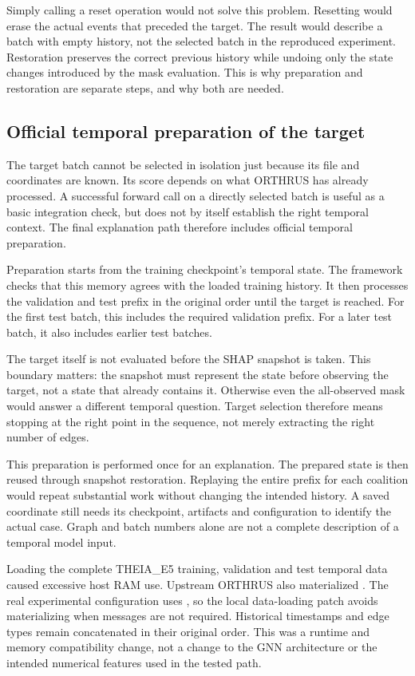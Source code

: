 \documentclass[11pt,a4paper]{article}
\newcommand{\code}[1]{\texttt{\detokenize{#1}}}
\begin{document}
Simply calling a reset operation would not solve this problem. Resetting would
erase the actual events that preceded the target. The result would describe a
batch with empty history, not the selected batch in the reproduced experiment.
Restoration preserves the correct previous history while undoing only the
state changes introduced by the mask evaluation. This is why preparation and
restoration are separate steps, and why both are needed.

\subsection{Official temporal preparation of the target}
The target batch cannot be selected in isolation just because its file and
coordinates are known. Its score depends on what ORTHRUS has already processed.
A successful forward call on a directly selected batch is useful as a basic
integration check, but does not by itself establish the right temporal context.
The final explanation path therefore includes official temporal preparation.

Preparation starts from the training checkpoint's temporal state. The framework
checks that this memory agrees with the loaded training history. It then
processes the validation and test prefix in the original order until the target
is reached. For the first test batch, this includes the required validation
prefix. For a later test batch, it also includes earlier test batches.

The target itself is not evaluated before the SHAP snapshot is taken. This
boundary matters: the snapshot must represent the state before observing the
target, not a state that already contains it. Otherwise even the all-observed
mask would answer a different temporal question. Target selection therefore
means stopping at the right point in the sequence, not merely extracting the
right number of edges.

This preparation is performed once for an explanation. The prepared state is
then reused through snapshot restoration. Replaying the entire prefix for each
coalition would repeat substantial work without changing the intended history.
A saved coordinate still needs its checkpoint, artifacts and configuration to
identify the actual case. Graph and batch numbers alone are not a complete
description of a temporal model input.

Loading the complete THEIA\_E5 training, validation and test temporal data
caused excessive host RAM use. Upstream ORTHRUS also materialized
\code{full_data.msg}. The real experimental configuration uses
\code{edge_features=edge_type}, so the local data-loading patch avoids
materializing \code{full_data.msg} when messages are not required. Historical
timestamps and edge types remain concatenated in their original order.
This was a runtime and memory compatibility change, not a change to the GNN
architecture or the intended numerical features used in the tested path.
\end{document}
